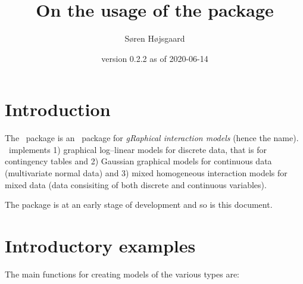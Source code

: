 \documentclass[12pt]{article}
\title{On the usage of the \pkg{gRim} package}
\author{S{\o}ren H{\o}jsgaard}
\date{\pkg{gRim} version 0.2.2 as of 2020-06-14}
\begin{document}


\renewenvironment{Schunk}{\linespread{.85}\scriptsize}{}

\makeatletter
\renewenvironment{Schunk}{
  \begin{lrbox}{\@tempboxa}
    \begin{boxedminipage}
      {\columnwidth}\small}
    {\end{boxedminipage}
  \end{lrbox}%
  \colorbox{myGray}{\usebox{\@tempboxa}}
}
\makeatother


\maketitle
\tableofcontents

\parindent0pt\parskip5pt


\def\dmod{\texttt{dmod}}
\def\cmod{\texttt{cmod}}
\def\mmod{\texttt{mmod}}

\def\imodo{\texttt{iModel}}
\def\dmodo{\texttt{dModel}}
\def\cmodo{\texttt{cModel}}
\def\mmodo{\texttt{mModel}}


\def\rformula#1{\texttt{\~{ }#1}}
\def\carcass{\texttt{carcass}}
\def\reinis{\texttt{reinis}}
\def\mildew{\texttt{mildew}}




\section{Introduction}



The \grim\ package is an \R\ package for \emph{gRaphical interaction
  models} (hence the name).  \grim\ implements 1) graphical
log--linear models for discrete data, that is for contingency tables
and 2) Gaussian graphical models for continuous data (multivariate
normal data) and 3) mixed homogeneous interaction models for mixed
data (data consisiting of both discrete and continuous variables).

The package is at an early stage of development and so is this
document.


\section{Introductory examples}
\label{sec:introex}

The main functions for creating models of the various types are:
\end{document}
